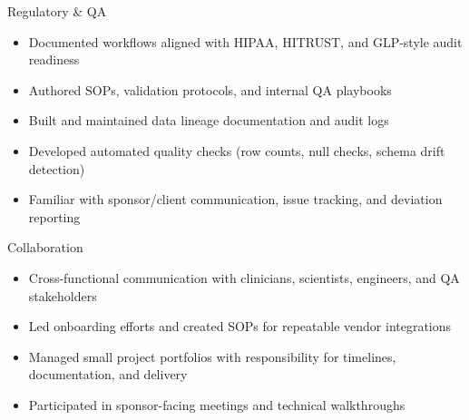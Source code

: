 \begin{cvskills}
    \cvskill
    {Regulatory \& QA}
    {\begin{minipage}[t]{0.8\textwidth}
        \begin{itemize}
            \item Documented workflows aligned with HIPAA, HITRUST, and GLP-style audit readiness
            \item Authored SOPs, validation protocols, and internal QA playbooks
            \item Built and maintained data lineage documentation and audit logs
            \item Developed automated quality checks (row counts, null checks, schema drift detection)
            \item Familiar with sponsor/client communication, issue tracking, and deviation reporting
        \end{itemize}
    \end{minipage}
    }

    \cvskill
    {Collaboration}
    {\begin{minipage}[t]{0.8\textwidth}
        \begin{itemize}
            \item Cross-functional communication with clinicians, scientists, engineers, and QA stakeholders
            \item Led onboarding efforts and created SOPs for repeatable vendor integrations
            \item Managed small project portfolios with responsibility for timelines, documentation, and delivery
            \item Participated in sponsor-facing meetings and technical walkthroughs
        \end{itemize}
    \end{minipage}
    }


\end{cvskills}
